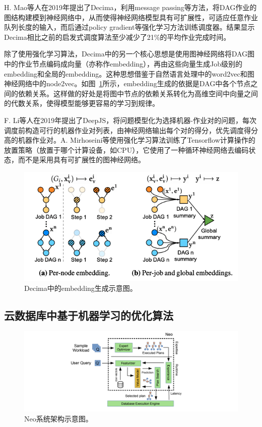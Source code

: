 H. Mao等人在2019年提出了Decima\parencite{mao2019learning}，利用message passing等方法，将DAG作业的图结构建模到神经网络中，从而使得神经网络模型具有可扩展性，可适应任意作业队列长度的输入，而后通过policy gradient等强化学习方法训练调度器。结果显示Decima相比之前的启发式调度算法至少减少了21\%的平均作业完成时间。

除了使用强化学习算法，Decima中的另一个核心思想是使用图神经网络将DAG图中的作业节点编码成向量（亦称作embedding），再由这些向量生成Job级别的embedding和全局的embedding。这种思想借鉴于自然语言处理中的word2vec和图神经网络中的node2vec。如图~\ref{decima_embedding}所示，embedding生成的依据是DAG中各个节点之间的依赖关系。这样做的好处是将图中节点的依赖关系转化为高维空间中向量之间的代数关系，使得模型能够更容易的学习到规律。

F. Li等人在2019年提出了DeepJS\parencite{li2019deepjs}，将问题模型化为选择机器-作业对的问题，每次调度前构造可行的机器作业对列表，由神经网络输出每个对的得分，优先调度得分高的机器作业对。A. Mirhoseini等\parencite{mirhoseini2017device}使用强化学习算法训练了Tensorflow计算操作的放置策略（放置于哪个计算设备，如CPU），它使用了一种循环神经网络去编码状态，而不是采用具有可扩展性的图神经网络。

\begin{figure}[h]
    \centerline{\includegraphics[width=\textwidth]{figures/decima-embedding.png}}
    \caption{Decima中的embedding生成示意图。}
    \label{decima_embedding}
\end{figure}

\subsection{云数据库中基于机器学习的优化算法}

\begin{figure}[h]
    \centerline{\includegraphics[width=\textwidth]{figures/neo-arch.png}}
    \caption{Neo系统架构示意图。}
    \label{neo_arch}
\end{figure}

